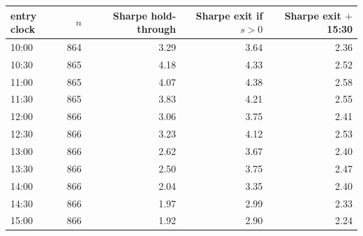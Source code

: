 \begingroup\small\setlength{\tabcolsep}{5pt}
\begin{tabular}{lrrrr}
\toprule
entry clock & $n$ & Sharpe hold-through & Sharpe exit if $s>0$ & Sharpe exit $+$ 15:30 \\
\midrule
10:00 & 864 & 3.29 & 3.64 & 2.36 \\
10:30 & 865 & 4.18 & 4.33 & 2.52 \\
11:00 & 865 & 4.07 & 4.38 & 2.58 \\
11:30 & 865 & 3.83 & 4.21 & 2.55 \\
12:00 & 866 & 3.06 & 3.75 & 2.41 \\
12:30 & 866 & 3.23 & 4.12 & 2.53 \\
13:00 & 866 & 2.62 & 3.67 & 2.40 \\
13:30 & 866 & 2.50 & 3.75 & 2.47 \\
14:00 & 866 & 2.04 & 3.35 & 2.40 \\
14:30 & 866 & 1.97 & 2.99 & 2.33 \\
15:00 & 866 & 1.92 & 2.90 & 2.24 \\
\bottomrule
\end{tabular}
\endgroup
